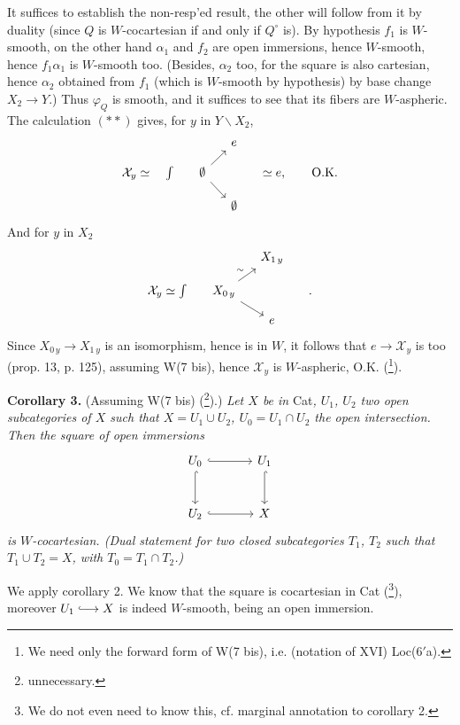 \documentclass[11pt]{article}
\newcommand{\msp}[1]{\marginpar{\footnotesize [#1]}}
\begin{document}
It suffices to establish the non-resp'ed result, the other will follow from it by duality (since $Q$ is $W$-cocartesian if and only if $Q^\circ$ is). By hypothesis $f_1$ is $W$-smooth, on the other hand $\alpha_1$ and $f_2$ are open immersions, hence $W$-smooth, hence $f_1\alpha_1$ is $W$-smooth too. (Besides, $\alpha_2$ too, for the square is also cartesian, hence $\alpha_2$ obtained from $f_1$ (which is $W$-smooth by hypothesis) by base change $X_2 \longrightarrow Y$.) Thus $\varphi_Q$ is smooth, and it suffices to see that its fibers are $W$-aspheric. The calculation $(**)$ gives, for $y$ in $Y\backslash X_2$,
\[
\begin{tikzcd}[row sep=small, column sep=small]
 & & e & \\
\mathcal{X}_y \simeq \quad \int &[-1.2em] \emptyset \arrow[ur] \arrow[dr] & &[1em] \simeq e, \qquad \text{O.K.} \\
 & & \emptyset &
\end{tikzcd}
\]
And for $y$ in $X_2$
\[
\begin{tikzcd}[row sep=small, column sep=small]
 & & X_{1\,y} & \\
\mathcal{X}_y \simeq \int &[-1.2em] X_{0\,y} \arrow[ur,"\sim"] \arrow[dr] & &[2em] . \\
 & & e &
\end{tikzcd}
\]
\msp{page 149}Since $X_{0\,y} \longrightarrow X_{1\,y}$ is an isomorphism, hence is in $W$, it follows that $e \longrightarrow \mathcal{X}_y$ is too (prop. 13, p. 125), assuming W(7 bis), hence $\mathcal{X}_y$ is $W$-aspheric, O.K. (\footnote{We need only the forward form of W(7 bis), i.e. (notation of XVI) Loc(6$'$a).}).

\textbf{Corollary 3.} (Assuming W(7 bis) (\footnote{unnecessary.}).) \textit{Let $X$ be in} Cat\textit{, $U_1$, $U_2$ two open subcategories of $X$ such that $X = U_1 \cup U_2$, $U_0 = U_1 \cap U_2$ the open intersection. Then the square of open immersions}
\[
\begin{tikzcd}[row sep=large, column sep=large]
U_0 \arrow[r,hook] \arrow[d,hook] & U_1 \arrow[d,hook] \\
U_2 \arrow[r,hook] & X
\end{tikzcd}
\]
\textit{is $W$-cocartesian. (Dual statement for two closed subcategories $T_1$, $T_2$ such that $T_1 \cup T_2 = X$, with $T_0 = T_1 \cap T_2$.)}

We apply corollary 2. We know that the square is cocartesian in Cat (\footnote{We do not even need to know this, cf. marginal annotation to corollary 2.}), moreover $U_1 \lhook\joinrel\longrightarrow X$ is indeed $W$-smooth, being an open immersion.
\end{document}
